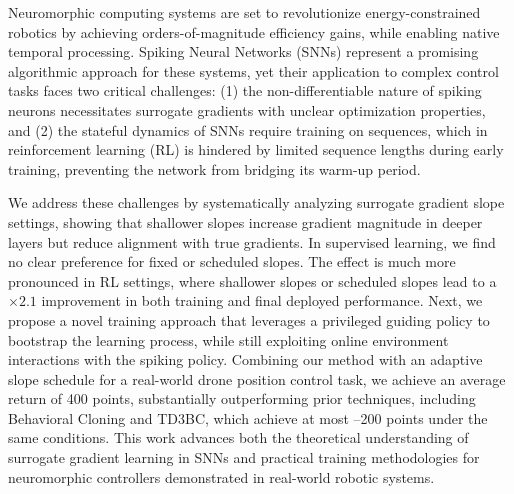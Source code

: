 Neuromorphic computing systems are set to revolutionize energy-constrained robotics by achieving orders-of-magnitude efficiency gains, while enabling native temporal processing. Spiking Neural Networks (SNNs) represent a promising algorithmic approach for these systems, yet their application to complex control tasks faces two critical challenges: (1) the non-differentiable nature of spiking neurons necessitates surrogate gradients with unclear optimization properties, and (2) the stateful dynamics of SNNs require training on sequences, which in reinforcement learning (RL) is hindered by limited sequence lengths during early training, preventing the network from bridging its warm-up period.

We address these challenges by systematically analyzing surrogate gradient slope settings, showing that shallower slopes increase gradient magnitude in deeper layers but reduce alignment with true gradients. In supervised learning, we find no clear preference for fixed or scheduled slopes. The effect is much more pronounced in RL settings, where shallower slopes or scheduled slopes lead to a $\times2.1$ improvement in both training and final deployed performance. Next, we propose a novel training approach that leverages a privileged guiding policy to bootstrap the learning process, while still exploiting online environment interactions with the spiking policy. Combining our method with an adaptive slope schedule for a real-world drone position control task, we achieve an average return of 400 points, substantially outperforming prior techniques, including Behavioral Cloning and TD3BC, which achieve at most –200 points under the same conditions. This work advances both the theoretical understanding of surrogate gradient learning in SNNs and practical training methodologies for neuromorphic controllers demonstrated in real-world robotic systems.